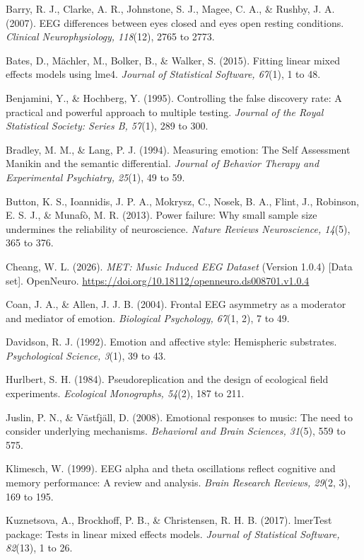 \documentclass[11pt,a4paper]{article}
\begin{document}
Barry, R. J., Clarke, A. R., Johnstone, S. J., Magee, C. A., \& Rushby, J. A. (2007). EEG differences between eyes closed and eyes open resting conditions. \emph{Clinical Neurophysiology, 118}(12), 2765 to 2773.

Bates, D., M\"achler, M., Bolker, B., \& Walker, S. (2015). Fitting linear mixed effects models using lme4. \emph{Journal of Statistical Software, 67}(1), 1 to 48.

Benjamini, Y., \& Hochberg, Y. (1995). Controlling the false discovery rate: A practical and powerful approach to multiple testing. \emph{Journal of the Royal Statistical Society: Series B, 57}(1), 289 to 300.

Bradley, M. M., \& Lang, P. J. (1994). Measuring emotion: The Self Assessment Manikin and the semantic differential. \emph{Journal of Behavior Therapy and Experimental Psychiatry, 25}(1), 49 to 59.

Button, K. S., Ioannidis, J. P. A., Mokrysz, C., Nosek, B. A., Flint, J., Robinson, E. S. J., \& Munaf\`o, M. R. (2013). Power failure: Why small sample size undermines the reliability of neuroscience. \emph{Nature Reviews Neuroscience, 14}(5), 365 to 376.

Cheang, W. L. (2026). \emph{MET: Music Induced EEG Dataset} (Version 1.0.4) [Data set]. OpenNeuro. \url{https://doi.org/10.18112/openneuro.ds008701.v1.0.4}

Coan, J. A., \& Allen, J. J. B. (2004). Frontal EEG asymmetry as a moderator and mediator of emotion. \emph{Biological Psychology, 67}(1, 2), 7 to 49.

Davidson, R. J. (1992). Emotion and affective style: Hemispheric substrates. \emph{Psychological Science, 3}(1), 39 to 43.

Hurlbert, S. H. (1984). Pseudoreplication and the design of ecological field experiments. \emph{Ecological Monographs, 54}(2), 187 to 211.

Juslin, P. N., \& V\"astfj\"all, D. (2008). Emotional responses to music: The need to consider underlying mechanisms. \emph{Behavioral and Brain Sciences, 31}(5), 559 to 575.

Klimesch, W. (1999). EEG alpha and theta oscillations reflect cognitive and memory performance: A review and analysis. \emph{Brain Research Reviews, 29}(2, 3), 169 to 195.

Kuznetsova, A., Brockhoff, P. B., \& Christensen, R. H. B. (2017). lmerTest package: Tests in linear mixed effects models. \emph{Journal of Statistical Software, 82}(13), 1 to 26.
\end{document}
